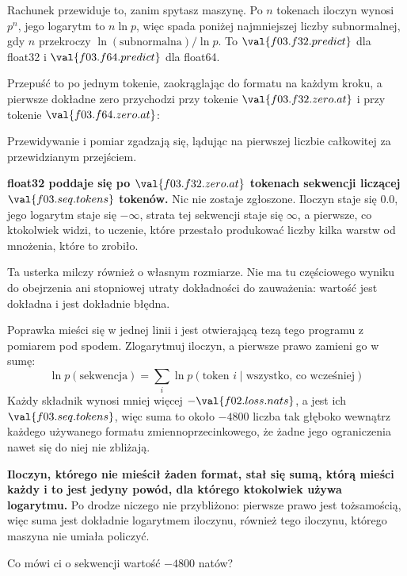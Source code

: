 \begin{fr}
\begin{ansblock}
Rachunek przewiduje to, zanim spytasz maszynę. Po $n$ tokenach iloczyn wynosi
$p^{n}$, jego logarytm to $n \ln p$, więc spada poniżej najmniejszej liczby
subnormalnej, gdy $n$ przekroczy $\ln(\text{subnormalna}) / \ln p$. To
$\val{f03.f32.predict}$ dla float32 i $\val{f03.f64.predict}$ dla float64.

Przepuść to po jednym tokenie, zaokrąglając do formatu na każdym kroku, a
pierwsze dokładne zero przychodzi przy tokenie $\val{f03.f32.zero.at}$ i przy
tokenie $\val{f03.f64.zero.at}$:
\end{ansblock}


\noindent
Przewidywanie i pomiar zgadzają się, lądując na pierwszej liczbie całkowitej za
przewidzianym przejściem.

\begin{warning}
\textbf{float32 poddaje się po $\val{f03.f32.zero.at}$ tokenach sekwencji
liczącej $\val{f03.seq.tokens}$ tokenów.} Nic nie zostaje zgłoszone. Iloczyn staje się
$\num{0.0}$, jego logarytm staje się $-\infty$, strata tej sekwencji staje się
$\infty$, a pierwsze, co ktokolwiek widzi, to uczenie, które przestało
produkować liczby \dash{} kilka warstw od mnożenia, które to zrobiło.

Ta usterka milczy również o własnym rozmiarze. Nie ma tu częściowego wyniku do
obejrzenia ani stopniowej utraty dokładności do zauważenia: wartość jest
dokładna i jest dokładnie błędna.
\end{warning}
\end{fr}

\begin{fr}
Poprawka mieści się w jednej linii i jest otwierającą tezą tego programu z
pomiarem pod spodem. Zlogarytmuj iloczyn, a pierwsze prawo zamieni go w sumę:
\[ \ln p(\text{sekwencja})
   = \sum_{i} \ln p(\text{token } i \mid \text{wszystko, co wcześniej}) \]
Każdy składnik wynosi mniej więcej $-\val{f02.loss.nats}$, a jest ich
$\val{f03.seq.tokens}$, więc suma to około $-4800$ \dash{} liczba tak głęboko
wewnątrz każdego używanego formatu zmiennoprzecinkowego, że żadne jego
ograniczenia nawet się do niej nie zbliżają.

\textbf{Iloczyn, którego nie mieścił żaden format, stał się sumą, którą mieści
każdy \dash{} i to jest jedyny powód, dla którego ktokolwiek używa logarytmu.}
Po drodze niczego nie przybliżono: pierwsze prawo jest tożsamością, więc suma
jest dokładnie logarytmem iloczynu, również tego iloczynu, którego maszyna nie
umiała policzyć.

Co mówi ci o sekwencji wartość $-4800$ natów?
\nextframe
\end{fr}


